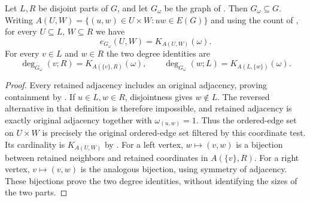 \begin{lemma}
Let $L,R$ be disjoint parts of $G$, and let $G_\omega$ be the graph of
. Then $G_\omega\subseteq G$.
Writing $A(U,W)=\{(u,w)\in U\times W:uw\in E(G)\}$ and using the
count of , for every $U\subseteq L$,
$W\subseteq R$ we have
\[
e_{G_\omega}(U,W)=K_{A(U,W)}(\omega).
\]
For every $v\in L$ and $w\in R$ the two degree identities are
\[
\deg_{G_\omega}(v;R)=K_{A(\{v\},R)}(\omega),\qquad
\deg_{G_\omega}(w;L)=K_{A(L,\{w\})}(\omega).
\]
\end{lemma}
\begin{proof}
Every retained adjacency includes an original adjacency, proving containment
by . If $u\in L,w\in R$, disjointness gives
$w\notin L$. The reversed alternative in that definition is therefore
impossible, and retained adjacency is exactly original adjacency together
with $\omega_{(u,w)}=1$. Thus the ordered-edge set on $U\times W$ is
precisely the original ordered-edge set filtered by this coordinate test.
Its cardinality is $K_{A(U,W)}$ by .
For a left vertex, $w\mapsto(v,w)$ is a bijection between retained
neighbors and retained coordinates in $A(\{v\},R)$. For a right vertex,
$v\mapsto(v,w)$ is the analogous bijection, using symmetry of adjacency.
These bijections prove the two degree identities, without identifying the
sizes of the two parts.
\end{proof}
